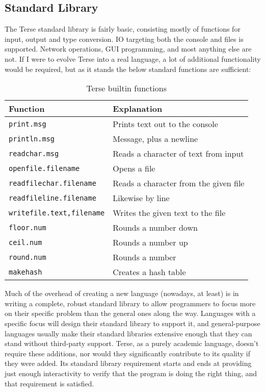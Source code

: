\documentclass[12pt]{article}
\newcommand{\code}[1]{\texttt{#1}}
\begin{document}
\subsection{Standard Library}

The Terse standard library is fairly basic, consisting mostly of
functions for input, output and type conversion. IO targeting both the
console and files is supported. Network operations, GUI programming,
and most anything else are not. If I were to evolve Terse into a real
language, a lot of additional functionality would be required, but as
it stands the below standard functions are sufficient:

\begin{table}
  \begin{tabular}{ | l | l | }
    \hline
    Function & Explanation \\
    \hline \hline
    \code{print.msg}				& Prints text out to the console		\\ \hline
    \code{println.msg}				& Message, plus a newline				\\ \hline
    \code{readchar.msg}				& Reads a character of text from input	\\ \hline
    \code{openfile.filename}		& Opens a file							\\ \hline
    \code{readfilechar.filename}	& Reads a character from the given file	\\ \hline
    \code{readfileline.filename}	& Likewise by line						\\ \hline
    \code{writefile.text,filename}	& Writes the given text to the file		\\ \hline
    \code{floor.num}				& Rounds a number down					\\ \hline
    \code{ceil.num}					& Rounds a number up					\\ \hline
    \code{round.num}				& Rounds a number						\\ \hline
    \code{makehash}					& Creates a hash table					\\ \hline
  \end{tabular}
  \caption{Terse builtin functions}
\end{table}

Much of the overhead of creating a new language (nowadays, at least)
is in writing a complete, robust standard library to allow programmers
to focus more on their specific problem than the general ones along
the way. Languages with a specific focus will design their standard
library to support it, and general-purpose languages usually make
their standard libraries extensive enough that they can stand without
third-party support. Terse, as a purely academic language, doesn't
require these additions, nor would they significantly contribute to
its quality if they were added. Its standard library requirement
starts and ends at providing just enough interactivity to verify that
the program is doing the right thing, and that requirement is
satisfied.
\end{document}
